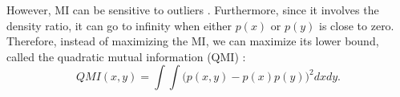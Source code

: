 \documentclass{article}
\begin{document}
\begin{comment}
\textbf{Proposition 3}
	\setlength{\abovedisplayskip}{3pt}
	\setlength{\belowdisplayskip}{3pt}
	$$-H(c(v|u_1,u_2,\ldots,u_D)) =MI(x,y) =\int \int p(x,y) \log \frac{p(x,y)}{p(x) p(y)}\text{dy}\text{ dx} $$ 
	
	\textbf{Proof:}
	
	\begin{multline} p(x,y) =p(y) \prod p_i(x_i) c(F_1(x_1),\ldots,F_D(x_D), F_y(y) )\\
	p(y)   \prod p_i(x_i)   \ c(F_y(y) |F_1(x_1),\ldots,F_D(x_D) ) c( F_1(x_1),\ldots,F_D(x_D) ) \\ 
	=p(y)  c(F_y(y) |F_1(x_1),\ldots,F_D(x_D) ) p(x) \label{mi} \  \ \ \ \ \   \ \    \   \ \ \ \ \ \  \  \   \   \   \   \  \  \ \ \ \ \ \ \  \ \ \    \
	\end{multline}
	
The last equality of Eq. (\ref{mi}) is due to:
$$p(x)=\prod_i p_i(x_i) c(F_1(x_1),\ldots,F_D(x_D))$$
Based on  Eq. (\ref{mi}) the mutual information between $x$ and $y$ can be written as:

\setlength{\abovedisplayskip}{1pt}
	\setlength{\belowdisplayskip}{1pt}
	\begin{multline} 
	I(x,y)=\int \int p_y(y) \prod_i p_i(x_i) c(F_1(x_1),\ldots,F_D(x_D), F_y(y) ) \\
	\cdot \log c(F_y(y) | F_1(x_1),\ldots,F_D(x_D)    ) \text{dy}\text{ dx}
	\end{multline}	
Now let $v=F_y(y); u_i=F_i(x_i)$ then $dv= p_y(y) dy$ ; $d u_i =p_i(x_i) dx_i$. The Eq. (7) can be rewritten as:	
		
	\begin{multline*} 
	I(x,y)=\int\ldots,\int c(v,u_1,\ldots,u_D) \log c(v|u_1,\ldots,u_D) dv du_1  du_D      \\
	=-H(c(v|u_1,\ldots,u_D))  \  \  \  \  \  \   \ \  \    \  \  \  \  \  \   \ \  \    \  \  \  \  \  \   \ \  \    \  \  \  \  \  \   \ \  \    \  \  \  \  \  \   \ \  \   \  \ \  \  
	\end{multline*}	
	\end{comment}
    


However, MI can be sensitive to outliers \cite{Torkkola:2003:FEN:944919.944981}. Furthermore, since it involves the density ratio, it can go to infinity when either $p(x)$ or $p(y)$ is close to zero. Therefore, instead of maximizing the MI, we can maximize its lower bound, called the quadratic mutual information (QMI) \cite{Torkkola:2003:FEN:944919.944981}:
\begin{equation}
	QMI(x,y)=\int \int  \big( p(x,y)-p(x)p(y ) \big)^2 dx dy.
\end{equation}
\end{document}
